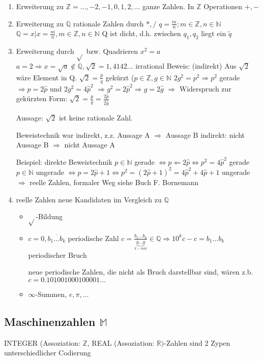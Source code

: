 \begin{enumerate}
 \item Erweiterung zu $\mathbb{Z} = {...,-2,-1,0,1,2,...}$ ganze Zahlen. In $\mathbb{Z}$ Operationen $+,-$
 \item Erweiterung zu $\mathbb{Q}$ rationale Zahlen durch $*,/$ $q=\frac{m}{n}; m \in \mathbb{Z}, n \in \mathbb{N}$
$\mathbb{Q} = {x | x=\frac{m}{n}, m \in \mathbb{Z}, n \in \mathbb{N}}$
Q ist dicht, d.h. zwischen $q_1, q_2$ liegt ein $\tilde{q}$
 \item Erweiterung durch $\sqrt{}$ bzw. Quadrieren $x^2=a$
$a=2 \Rightarrow x = \sqrt{a} \notin \mathbb{Q}, \sqrt{2}=1,4142...$ irrational
Beweis: (indirekt)
Aus $\sqrt{2}$ wäre Element in Q. $\sqrt{2}=\frac{p}{q}$ gekürzt ($p \in \mathbb{Z}, g \in \mathbb{N}$
$2g^2=p^2 \Rightarrow p^2$ gerade $\Rightarrow p=2\hat{p}$ und $2g^2=4\hat{p}^2$
$\Rightarrow g^2 = 2\hat{p}^2 \Rightarrow g=2\hat{g}$ 
$\Rightarrow$ Widerspruch zur gekürzten Form: $\sqrt{2}=\frac{p}{q}=\frac{2\hat{p}}{2\hat{g}}$

Aussage: $\sqrt{2}$ ist keine rationale Zahl.

Beweistechnik war indirekt, z.z. Aussage A $\Rightarrow$ Aussage B
indirekt: nicht Aussage B $\Rightarrow$ nicht Aussage A

Beispiel: direkte Beweistechnik
$p \in \mathbb{N}$ gerade $\Leftrightarrow p \Leftarrow 2 \hat{p} \Leftrightarrow p^2 = 4\hat{p}^2$ gerade
$p \in \mathbb{N}$ ungerade $\Leftrightarrow p = 2 \hat{p}+1 \Leftrightarrow p^2 = (2\hat{p}+1)^2=4\hat{p}^2+4\hat{p}+1$ ungerade
$\Rightarrow$ reelle Zahlen, formaler Weg siehe Buch F. Bornemann

 \item reelle Zahlen
  neue Kandidaten im Vergleich zu $\mathbb{Q}$
\begin{itemize}
 \item $\sqrt{}$-Bildung
 \item $c = 0,\overline{b_1...b_k}$ periodische Zahl
$c = \frac{b_1...b_k}{\underbrace{g...g}_{k-mal}} \in \mathbb{Q} \Rightarrow 10^k c -c = b_1 \ldots b_k$ periodischer Bruch

neue periodische Zahlen, die nicht als Bruch darstellbar sind, wären z.b. $c=0.101001000100001...$
 \item $\infty$-Summen, $e, \pi,\ldots$
\end{itemize}

\end{enumerate}

\subsection{Maschinenzahlen $\mathbb{M}$}
INTEGER (Assoziation: $\mathbb{Z}$, REAL (Assoziation: $\mathbb{R})$-Zahlen sind 2 Zypen unterschiedlicher Codierung

